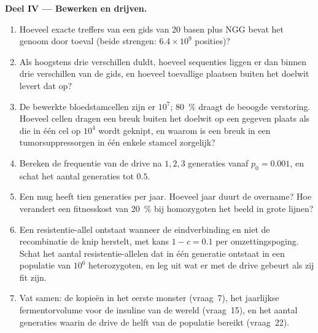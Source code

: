 \begin{problem}
\medskip
\noindent\textbf{Deel IV --- Bewerken en drijven.}
\begin{enumerate}[resume]
  \item Hoeveel exacte treffers van een gids van 20 basen plus NGG
        bevat het genoom door toeval (beide strengen: $6.4\times 10^{9}$
        posities)?
  \item Als  hoogstens drie verschillen duldt, hoeveel sequenties
        liggen er dan binnen drie verschillen van de gids, en hoeveel
        toevallige plaatsen buiten het doelwit levert dat op?
  \item De bewerkte bloedstamcellen zijn er $10^{7}$; \qty{80}{\%}
        draagt de beoogde verstoring. Hoeveel cellen dragen een breuk
        buiten het doelwit op een gegeven plaats als die in één cel op
        $10^{4}$ wordt geknipt, en waarom is een breuk in een
        tumorsuppressorgen in één enkele stamcel zorgelijk?
  \item Bereken de frequentie van de drive na $1, 2, 3$ generaties
        vanaf $p_{0} = 0.001$, en schat het aantal generaties tot $0.5$.
  \item Een mug heeft tien generaties per jaar. Hoeveel jaar duurt de
        overname? Hoe verandert een fitnesskost van \qty{20}{\%} bij
        homozygoten het beeld in grote lijnen?
  \item Een resistentie-allel ontstaat wanneer de eindverbinding en
        niet de recombinatie de knip herstelt, met kans $1 - c = 0.1$
        per omzettingspoging. Schat het aantal resistentie-allelen dat
        in één generatie ontstaat in een populatie van $10^{6}$
        heterozygoten, en leg uit wat er met de drive gebeurt als zij
        fit zijn.
  \item Vat samen: de kopieën in het eerste monster (vraag~7), het
        jaarlijkse fermentorvolume voor de insuline van de wereld
        (vraag~15), en het aantal generaties waarin de drive de helft
        van de populatie bereikt (vraag~22).
\end{enumerate}
\end{problem}
